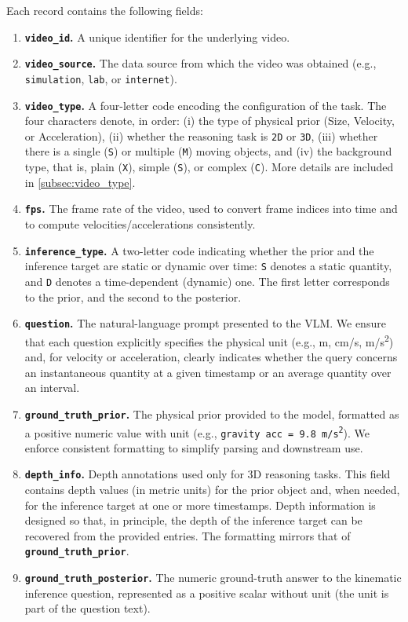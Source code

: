Each record contains the following fields:
\begin{enumerate}[leftmargin=*]
  \item \textbf{\texttt{video\_id}.} A unique identifier for the underlying video.
  \item \textbf{\texttt{video\_source}.} The data source from which the video was obtained (e.g., \texttt{simulation}, \texttt{lab}, or \texttt{internet}).
  \item \textbf{\texttt{video\_type}.} A four-letter code encoding the configuration of the task.
  The four characters denote, in order: (i) the type of physical prior (Size, Velocity, or Acceleration), (ii) whether the reasoning task is \texttt{2D} or \texttt{3D}, (iii) whether there is a single (\texttt{S}) or multiple (\texttt{M}) moving objects, and (iv) the background type, that is, plain (\texttt{X}), simple (\texttt{S}), or complex (\texttt{C}). More details are included in \autoref{subsec:video_type}.
  \item \textbf{\texttt{fps}.} The frame rate of the video, used to convert frame indices into time and to compute velocities/accelerations consistently.
  \item \textbf{\texttt{inference\_type}.} A two-letter code indicating whether the prior and the inference target are static or dynamic over time:
  \texttt{S} denotes a static quantity, and \texttt{D} denotes a time-dependent (dynamic) one.
  The first letter corresponds to the prior, and the second to the posterior.
  \item \textbf{\texttt{question}.} The natural-language prompt presented to the VLM.
  We ensure that each question explicitly specifies the physical unit (e.g., m, cm/s, m/s\textsuperscript{2}) and, for velocity or acceleration, clearly indicates whether the query concerns an instantaneous quantity at a given timestamp or an average quantity over an interval.
  \item \textbf{\texttt{ground\_truth\_prior}.} The physical prior provided to the model, formatted as a positive numeric value with unit (e.g., \texttt{gravity acc = 9.8 m/s\textsuperscript{2}}).
  We enforce consistent formatting to simplify parsing and downstream use.
  \item \textbf{\texttt{depth\_info}.} Depth annotations used only for 3D reasoning tasks.
  This field contains depth values (in metric units) for the prior object and, when needed, for the inference target at one or more timestamps.
  Depth information is designed so that, in principle, the depth of the inference target can be recovered from the provided entries.
  The formatting mirrors that of \textbf{\texttt{ground\_truth\_prior}}.
  \item \textbf{\texttt{ground\_truth\_posterior}.} The numeric ground-truth answer to the kinematic inference question, represented as a positive scalar without unit (the unit is part of the question text).
\end{enumerate}

